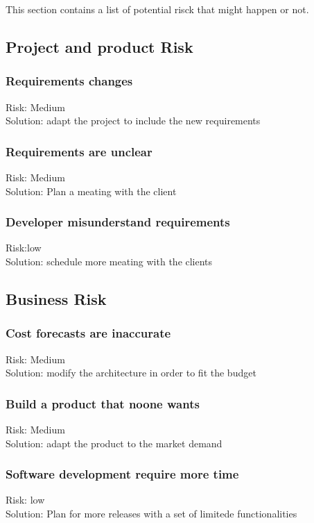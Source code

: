 This section contains a list of potential risck that might happen or not.\\

\subsection{Project and product Risk}
\subsubsection{Requirements changes}
Risk: Medium\\
Solution: adapt the project to include the new requirements\\
\subsubsection{Requirements are unclear} 
Risk: Medium\\
Solution: Plan a meating with the client\\
\subsubsection{Developer misunderstand requirements}
Risk:low\\
Solution: schedule more meating with the clients\\

\subsection{Business Risk}

\subsubsection{Cost forecasts are inaccurate}
Risk: Medium\\
Solution: modify the architecture in order to fit the budget\\

\subsubsection{Build a product that noone wants}
Risk: Medium\\
Solution: adapt the product to the market demand\\

\subsubsection{Software development require more time}
Risk: low\\
Solution: Plan for more releases with a set of limitede functionalities\\



